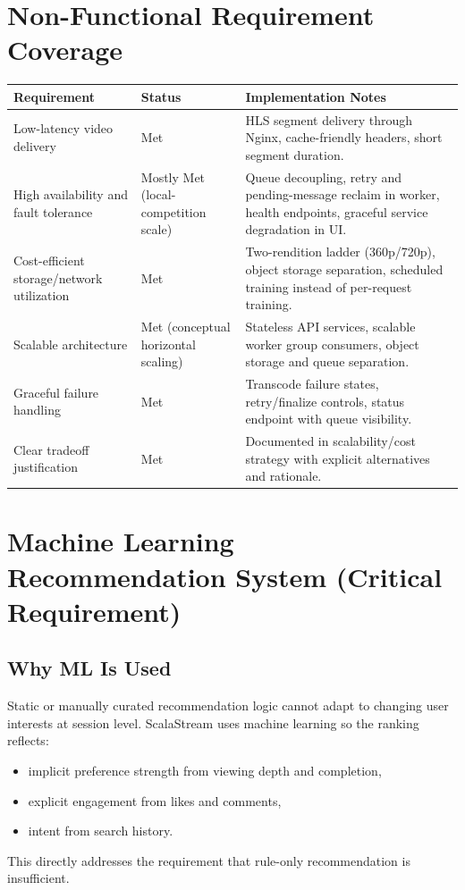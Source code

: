\documentclass[11pt,a4paper]{article}
\begin{document}
\section{Non-Functional Requirement Coverage}
\begin{longtable}{@{}p{4.4cm}p{2.1cm}p{8.0cm}@{}}
\toprule
\textbf{Requirement} & \textbf{Status} & \textbf{Implementation Notes} \\
\midrule
\endhead
Low-latency video delivery & Met & HLS segment delivery through Nginx, cache-friendly headers, short segment duration. \\
High availability and fault tolerance & Mostly Met (local-competition scale) & Queue decoupling, retry and pending-message reclaim in worker, health endpoints, graceful service degradation in UI. \\
Cost-efficient storage/network utilization & Met & Two-rendition ladder (360p/720p), object storage separation, scheduled training instead of per-request training. \\
Scalable architecture & Met (conceptual horizontal scaling) & Stateless API services, scalable worker group consumers, object storage and queue separation. \\
Graceful failure handling & Met & Transcode failure states, retry/finalize controls, status endpoint with queue visibility. \\
Clear tradeoff justification & Met & Documented in scalability/cost strategy with explicit alternatives and rationale. \\
\bottomrule
\end{longtable}

\section{Machine Learning Recommendation System (Critical Requirement)}
\subsection{Why ML Is Used}
Static or manually curated recommendation logic cannot adapt to changing user interests at session level. ScalaStream uses machine learning so the ranking reflects:
\begin{itemize}[leftmargin=1.2em]
  \item implicit preference strength from viewing depth and completion,
  \item explicit engagement from likes and comments,
  \item intent from search history.
\end{itemize}
This directly addresses the requirement that rule-only recommendation is insufficient.
\end{document}
